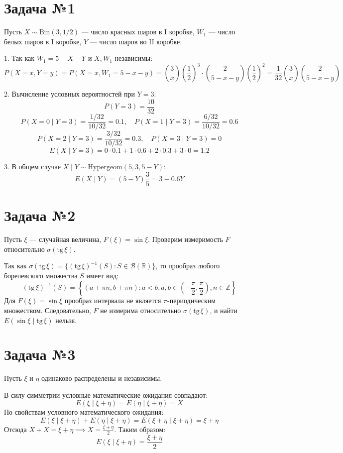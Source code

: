 \documentclass[12pt]{article}
\begin{document}
\section*{Задача №1}
Пусть $X \sim \text{Bin}(3, 1/2)$ — число красных шаров в I коробке, $W_1$ — число белых шаров в I коробке, $Y$ — число шаров во II коробке.

1. Так как $W_1 = 5 - X - Y$ и $X, W_1$ независимы:
\[
P(X=x, Y=y) = P(X=x, W_1 = 5-x-y) = \binom{3}{x}\left(\frac{1}{2}\right)^3 \cdot \binom{2}{5-x-y}\left(\frac{1}{2}\right)^2 = \frac{1}{32} \binom{3}{x} \binom{2}{5-x-y}
\]

2. Вычисление условных вероятностей при $Y=3$:
\[
P(Y=3) = \frac{10}{32}
\]
\[
P(X=0 \mid Y=3) = \frac{1/32}{10/32} = 0.1, \quad P(X=1 \mid Y=3) = \frac{6/32}{10/32} = 0.6
\]
\[
P(X=2 \mid Y=3) = \frac{3/32}{10/32} = 0.3, \quad P(X=3 \mid Y=3) = 0
\]
\[
E(X \mid Y=3) = 0 \cdot 0.1 + 1 \cdot 0.6 + 2 \cdot 0.3 + 3 \cdot 0 = 1.2
\]

3. В общем случае $X \mid Y \sim \text{Hypergeom}(5, 3, 5-Y)$:
\[
E(X \mid Y) = (5-Y)\frac{3}{5} = 3 - 0.6Y
\]

\bigskip
\section*{Задача №2}
Пусть $\xi$ — случайная величина, $F(\xi) = \sin \xi$. Проверим измеримость $F$ относительно $\sigma(\text{tg}\,\xi)$.

Так как $\sigma(\text{tg}\,\xi) = \{ (\text{tg}\,\xi)^{-1}(S) : S \in \mathcal{B}(\mathbb{R}) \}$, то прообраз любого борелевского множества $S$ имеет вид:
\[
(\text{tg}\,\xi)^{-1}(S) = \left\{ (a + \pi n, b + \pi n) : a < b, a,b \in \left(-\frac{\pi}{2}, \frac{\pi}{2}\right), n \in \mathbb{Z} \right\}
\]
Для $F(\xi) = \sin \xi$ прообраз интервала не является $\pi$-периодическим множеством. Следовательно, $F$ не измерима относительно $\sigma(\text{tg}\,\xi)$, и найти $E(\sin \xi \mid \text{tg}\,\xi)$ нельзя.

\bigskip
\section*{Задача №3}
Пусть $\xi$ и $\eta$ одинаково распределены и независимы.

В силу симметрии условные математические ожидания совпадают:
\[
E(\xi \mid \xi + \eta) = E(\eta \mid \xi + \eta) = X
\]
По свойствам условного математического ожидания:
\[
E(\xi \mid \xi + \eta) + E(\eta \mid \xi + \eta) = E(\xi + \eta \mid \xi + \eta) = \xi + \eta
\]
Отсюда $X + X = \xi + \eta \implies X = \frac{\xi + \eta}{2}$. Таким образом:
\[
E(\xi \mid \xi + \eta) = \frac{\xi + \eta}{2}
\]
\end{document}
